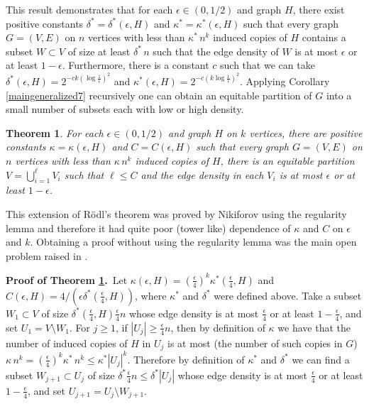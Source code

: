 \documentclass[11pt]{article}
\newtheorem{theorem}{Theorem}[section]
\begin{document}
This result demonstrates that for each $\epsilon \in (0,1/2)$ and
graph $H$, there exist positive constants
$\delta^*=\delta^*(\epsilon,H)$ and $\kappa^*=\kappa^*(\epsilon,H)$
such that every graph $G=(V,E)$ on $n$ vertices with less than
$\kappa^* \,n^k$ induced copies of $H$ contains a subset $W \subset
V$ of size at least $\delta^*\,n$ such that the edge density of $W$
is at most $\epsilon$ or at least $1-\epsilon$. Furthermore, there
is a constant $c$ such that we can take $\delta^*(\epsilon,H)=2^{-ck
(\log \frac{1}{\epsilon})^2}$ and $\kappa^*(\epsilon,H)=2^{-c(k\log
\frac{1}{\epsilon})^2}$. Applying Corollary \ref{maingeneralized7}
recursively one can obtain an equitable partition of $G$ into a
small number of subsets each with low or high density.

\begin{theorem}\label{weakversion}
For each $\epsilon \in (0,1/2)$ and graph $H$ on $k$ vertices, there
are positive constants $\kappa=\kappa(\epsilon,H)$ and
$C=C(\epsilon,H)$ such that every graph $G=(V,E)$ on $n$ vertices
with less than $\kappa\, n^{k}$ induced copies of $H$, there is an
equitable partition $V=\bigcup_{i=1}^{\ell} V_i$ such that $\ell
\leq C$ and the edge density in each $V_i$  is at most $\epsilon$ or
at least $1-\epsilon$.
\end{theorem}

\noindent This extension of R\"odl's theorem was proved by Nikiforov
\cite{Ni} using the regularity lemma and therefore it had quite poor
(tower like) dependence of $\kappa$ and $C$ on $\epsilon$ and $k$.
Obtaining a proof without using the regularity lemma was the main
open problem raised in \cite{Ni} .

\vspace{0.2cm}
\noindent
{\bf Proof of Theorem \ref{weakversion}.}\,
Let
$\kappa(\epsilon,H)=(\frac{\epsilon}{4})^k\kappa^*(\frac{\epsilon}{4},H)$
and $C(\epsilon,H)=4/(\epsilon \delta^*(\frac{\epsilon}{4},H))$, where
$\kappa^*$ and $\delta^*$ were defined above.
Take a subset $W_1 \subset V$ of size $
\delta^*(\frac{\epsilon}{4},H)\frac{\epsilon}{4}n$ whose edge
density is at most $\frac{\epsilon}{4}$ or at least
$1-\frac{\epsilon}{4}$, and set $U_1 =V\setminus W_1$. For $j \geq
1$, if $|U_j| \geq \frac{\epsilon}{4} n$, then by definition of $\kappa$ we have that the number of induced copies of
$H$ in $U_j$ is at most (the number of such copies in $G$) $\kappa\,n^k=
(\frac{\epsilon}{4})^k\kappa^*\,n^k \leq \kappa^*|U_j|^k$.
Therefore by definition of $\kappa^*$ and $\delta^*$ we can
find a subset $W_{j+1} \subset U_j$ of size
$\delta^*\frac{\epsilon}{4}n \leq \delta^*|U_j|$ whose edge
density is at most $\frac{\epsilon}{4}$ or at least
$1-\frac{\epsilon}{4}$, and set $U_{j+1}=U_j \setminus W_{j+1}$.
\end{document}
